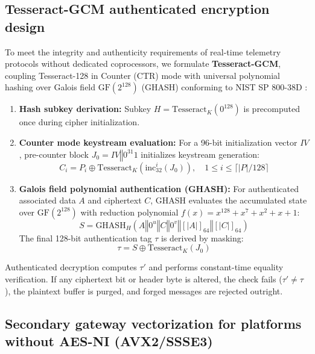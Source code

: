 \documentclass[10pt,twocolumn]{article}
\begin{document}
\subsection{Tesseract-GCM authenticated encryption design}
\label{subsec:gcm_design}
To meet the integrity and authenticity requirements of real-time telemetry protocols without dedicated coprocessors, we formulate \textbf{Tesseract-GCM}, coupling Tesseract-128 in Counter (CTR) mode with universal polynomial hashing over Galois field $\text{GF}(2^{128})$ (GHASH) conforming to NIST SP 800-38D \cite{dworkin2007gcm}:
\begin{enumerate}
    \item \textbf{Hash subkey derivation:} Subkey $H = \text{Tesseract}_K(0^{128})$ is precomputed once during cipher initialization.
    \item \textbf{Counter mode keystream evaluation:} For a 96-bit initialization vector $IV$, pre-counter block $J_0 = IV \mathbin{\Vert} 0^{31}1$ initializes keystream generation:
    \begin{equation}
        C_i = P_i \oplus \text{Tesseract}_K(\text{inc}_{32}^i(J_0)), \quad 1 \le i \le \lceil |P|/128 \rceil
    \end{equation}
    \item \textbf{Galois field polynomial authentication (GHASH):} For authenticated associated data $A$ and ciphertext $C$, GHASH evaluates the accumulated state over $\text{GF}(2^{128})$ with reduction polynomial $f(x) = x^{128} + x^7 + x^2 + x + 1$:
    \begin{equation}
        S = \text{GHASH}_H(A \mathbin{\Vert} 0^u \mathbin{\Vert} C \mathbin{\Vert} 0^v \mathbin{\Vert} [|A|]_{64} \mathbin{\Vert} [|C|]_{64})
    \end{equation}
    The final 128-bit authentication tag $\tau$ is derived by masking:
    \begin{equation}
        \tau = S \oplus \text{Tesseract}_K(J_0)
    \end{equation}
\end{enumerate}
Authenticated decryption computes $\tau'$ and performs constant-time equality verification. If any ciphertext bit or header byte is altered, the check fails ($\tau' \neq \tau$), the plaintext buffer is purged, and forged messages are rejected outright.

\subsection{Secondary gateway vectorization for platforms without AES-NI (AVX2/SSSE3)}
\label{subsec:gateway_simd}
\end{document}
